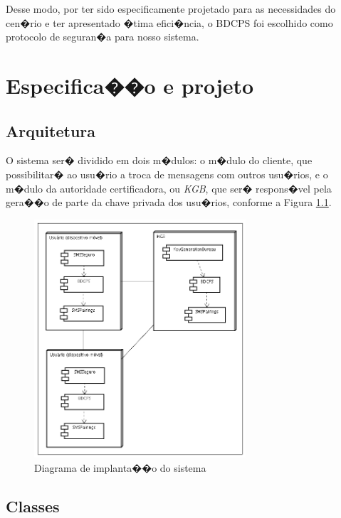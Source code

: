\documentclass[a4paper,capchap,espacoduplo,normaltoc]{abntepusp}
\begin{document}
Desse modo, por ter sido especificamente projetado para as necessidades do cen�rio e ter apresentado �tima efici�ncia, o BDCPS foi escolhido como protocolo de seguran�a para nosso sistema.


\chapter{Especifica��o e projeto}
\section{Arquitetura}

O sistema ser� dividido em dois m�dulos: o m�dulo do cliente, que possibilitar� ao usu�rio a troca de mensagens com outros usu�rios, e o m�dulo da autoridade certificadora, ou \emph{KGB}, que ser� respons�vel pela gera��o de parte da chave privada dos usu�rios, conforme a Figura \ref{fig:deploy_diagram}. 

\begin{figure}[h]
	\centering
		\includegraphics[width=0.70\textwidth]{figuras/DeploymentDiagram.png}
	\caption{Diagrama de implanta��o do sistema}
	\label{fig:deploy_diagram}
\end{figure}

\section{Classes}
\end{document}
